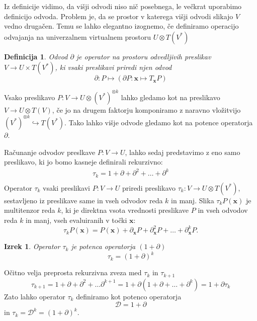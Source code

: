 \documentclass{article}
\newcommand{\x}{\mathbf{x}}
\newcommand{\D}{\partial}
\newcommand{\Dplus}{\mathcal{D}}
\newcommand{\sumd}{\tau}
\newtheorem{definicija}{Definicija}[section]
\newtheorem{izrek}{Izrek}[section]
\begin{document}
Iz definicije vidimo, da višji odvodi niso nič posebnega, le večkrat uporabimo
definicijo odvoda. Problem je, da se prostor v katerega višji odvodi slikajo $V$
vedno drugačen. Temu se lahko elegantno izognemo, če definiramo operacijo
odvajanja na univerzalnem virtualnem prostoru $U\otimes T(V^*)$
\begin{definicija}\label{def:partial}
  Odvod
  $\D$ je operator na prostoru odvedljivih preslikav $V\to U\times T(V^*)$, ki vsaki preslikavi
  priredi njen odvod
  \begin{equation}
    \label{eq:odvod_splosen}
    \D : P \mapsto (\D P:\x\mapsto T_\x P)
  \end{equation}
\end{definicija}
Vsako preslikavo $P:V\to U\otimes (V^*)^{\otimes k}$ lahko gledamo kot na
preslikavo $V\to U\otimes T(V)$, če jo na drugem faktorju komponiramo z naravno vložitvijo $(V^*)^{\otimes k}\hookrightarrow T(V^*)$. Tako lahko višje odvode gledamo kot
na potence operatorja $\D$. 

Računanje odvodov preslkave $P:V\to U$, lahko sedaj predstavimo z eno samo
preslikavo, ki jo bomo kasneje definirali rekurzivno:
\begin{eqnarray}
  \label{eq:vsi_odvodi}
  \sumd_k = 1+\D +\D^2 +\ldots + \D^k\\ 
\end{eqnarray}
Operator $\sumd_k$ vsaki preslikavi $P: V\to U$ priredi preslikavo $\sumd_k:V\to
U\otimes T(V^*)$, sestavljeno iz preslikave same in vseh odvodov reda $k$ in
manj. Slika $\sumd_kP(\x)$ je multitenzor reda $k$, ki je direktna vsota
vrednosti preslikave $P$ in vseh odvodov reda $k$ in manj, vseh evaluiranih v
točki $\x$:
\begin{equation}
  \label{eq:multi_odvod}
  \sumd_kP(\x) = P(\x)+\D_\x P + \D^2_\x P + \ldots + \D^k_\x P.
\end{equation}
\begin{izrek}
  Operator $\sumd_k$ je potenca operatorja $(1+\D)$
  \begin{equation}
    \label{eq:potenca(1+d)}
    \tau_k=(1+\D)^k
  \end{equation}
\end{izrek}
Očitno velja preprosta rekurzivna zveza med $\sumd_k$ in $\sumd_{k+1}$
\begin{equation}
   \label{eq:rekurzija}
   \sumd_{k+1} = 1 + \D +\D^2+\ldots \D^{k+1} = 1+\D(1+\D+\ldots +\D^{k}) = 1+\D\sumd_k
\end{equation}
 Zato lahko operator $\sumd_k$ definiramo kot potenco operatorja 
 \begin{equation}
   \label{eq:dplus1}
   \Dplus = 1 + \D
 \end{equation}
in $\sumd_k=\Dplus^k=(1+\D)^k$. 
\end{document}
